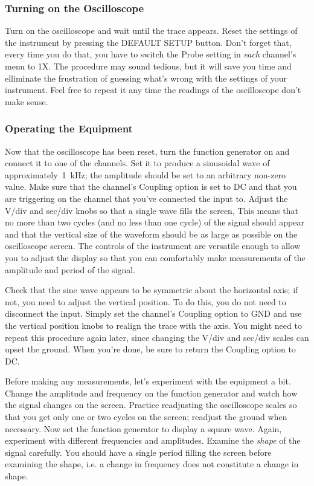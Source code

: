 \subsubsection{Turning on the Oscilloscope}
\label{sec:scope:ground}
Turn on the oscilloscope and wait until the trace appears. Reset the settings
of the instrument by pressing the DEFAULT SETUP button. Don't forget that,
every time you do that, you have to switch the Probe setting in {\it each}
channel's menu to 1X. The procedure may sound tedious, but it will save you
time and elliminate the frustration of guessing what's wrong with the settings
of your instrument. Feel free to repeat it any time the readings of the
oscilloscope don't make sense.

\subsubsection{Operating the Equipment}
\label{sec:scope:oper}
Now that the oscilloscope has been reset, turn the function generator on and 
connect it to one of the channels.  Set it to produce a sinusoidal wave of 
approximately~1~kHz; the amplitude should be set to an arbitrary non-zero 
value. Make sure that the channel's Coupling option is set to DC and that 
you are triggering on the channel that you've connected the input to. Adjust 
the V/div and sec/div knobs so that a single wave fills the screen,
This means that no more than two cycles (and no less than one cycle) of the
signal should appear and that the vertical size of the waveform should be as
large as possible on the oscilloscope screen.  The controls of the instrument
are versatile enough to allow you to adjust the display so that you can
comfortably make measurements of the amplitude and period of the signal.

\noindent Check that the sine wave appears to be symmetric about the
horizontal axis; if not, you need to adjust the vertical position. To do this,
you do not need to disconnect the input. Simply set the channel's Coupling
option to GND and use the vertical position knobs to realign the trace with the
axis. You might need to repeat this procedure again later, since changing the
V/div and sec/div scales can upset the ground. When you're done, be sure to
return the Coupling option to DC.

\noindent Before making any measurements, let's experiment with the equipment a
bit. Change the amplitude and frequency on the function generator and watch how
the signal changes on the screen. Practice readjusting the oscilloscope scales
so that you get only one or two cycles on the screen; readjust the ground when 
necessary.  Now set the function generator to display a square wave.  Again,
experiment with different frequencies and amplitudes. Examine the {\it shape}
of the signal carefully.  You should have a single period filling the screen
before examining the shape, i.e. a change in frequency does not constitute a 
change in shape. \\

